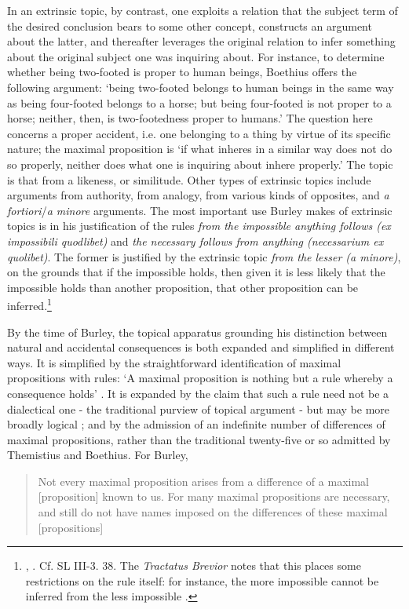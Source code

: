 \documentclass[]{article}
\begin{document}
In an extrinsic topic, by contrast, one exploits a relation that the subject term of the desired conclusion bears to some other concept, constructs an argument about the latter, and thereafter leverages the original relation to infer something about the original subject one was inquiring about. For instance, to determine whether being two-footed is proper to human beings, Boethius offers the following argument: `being two-footed belongs to human beings in the same way as being four-footed belongs to a horse; but being four-footed is not proper to a horse; neither, then, is two-footedness proper to humans.' The question here concerns a proper accident, i.e. one belonging to a thing by virtue of its specific nature; the maximal proposition is `if what inheres in a similar way does not do so properly, neither does what one is inquiring about inhere properly.' The topic is that from a likeness, or similitude. Other types of extrinsic topics include arguments from authority, from analogy, from various kinds of opposites, and \textit{a fortiori}/\textit{a minore} arguments. The most important use Burley makes of extrinsic topics is in his justification of the rules \textit{from the impossible anything follows (ex impossibili quodlibet)} and \textit{the necessary follows from anything (necessarium ex quolibet)}. The former is justified by the extrinsic topic \textit{from the lesser (a minore)}, on the grounds that if the impossible holds, then given it is less likely that the impossible holds than another proposition, that other proposition can be inferred.\footnote{\cite[V. 70, pp. 128-129]{Green-Pedersen1980b}, \cite[II. i. 1, p. 61]{BurleyDPAL}. Cf. SL III-3. 38. The \textit{Tractatus Brevior} notes that this places some restrictions on the rule itself: for instance, the more impossible cannot be inferred from the less impossible \cite[pp. 248.19-249.3]{BurleyDPAL}. }

By the time of Burley, the topical apparatus grounding his distinction between natural and accidental consequences is both expanded and simplified in different ways. It is simplified by the straightforward identification of maximal propositions with rules: `A maximal proposition is nothing but a rule whereby a consequence holds' \cite[II. i. 2, p. 76]{BurleyDPAL}. It is expanded by the claim that such a rule need not be a dialectical one - the traditional purview of topical argument - but may be more broadly logical \cite[II. i. 2, p. 76]{BurleyDPAL}; and by the admission of an indefinite number of differences of maximal propositions, rather than the traditional twenty-five or so admitted by Themistius and Boethius. For Burley,
\begin{quote}
	Not every maximal proposition arises from a difference of a maximal [proposition] known to us. For many maximal propositions are necessary, and still do not have names imposed on the differences of these maximal [propositions] \cite[II. i. 2, pp. 76-77]{BurleyDPAL}
\end{quote}
\end{document}
